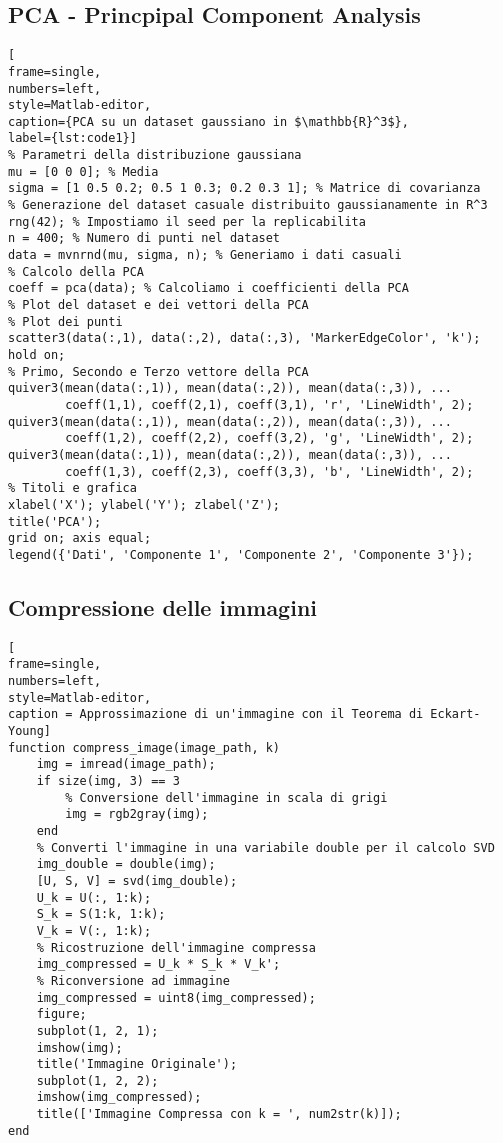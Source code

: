 \documentclass[11pt]{article}
\begin{document}
\subsection{PCA - Princpipal Component Analysis}\label{pca}
\begin{lstlisting}[
frame=single,
numbers=left,
style=Matlab-editor,
caption={PCA su un dataset gaussiano in $\mathbb{R}^3$},
label={lst:code1}]
% Parametri della distribuzione gaussiana
mu = [0 0 0]; % Media
sigma = [1 0.5 0.2; 0.5 1 0.3; 0.2 0.3 1]; % Matrice di covarianza
% Generazione del dataset casuale distribuito gaussianamente in R^3
rng(42); % Impostiamo il seed per la replicabilita
n = 400; % Numero di punti nel dataset
data = mvnrnd(mu, sigma, n); % Generiamo i dati casuali
% Calcolo della PCA
coeff = pca(data); % Calcoliamo i coefficienti della PCA
% Plot del dataset e dei vettori della PCA
% Plot dei punti
scatter3(data(:,1), data(:,2), data(:,3), 'MarkerEdgeColor', 'k'); 
hold on;
% Primo, Secondo e Terzo vettore della PCA
quiver3(mean(data(:,1)), mean(data(:,2)), mean(data(:,3)), ...
        coeff(1,1), coeff(2,1), coeff(3,1), 'r', 'LineWidth', 2); 
quiver3(mean(data(:,1)), mean(data(:,2)), mean(data(:,3)), ...
        coeff(1,2), coeff(2,2), coeff(3,2), 'g', 'LineWidth', 2);
quiver3(mean(data(:,1)), mean(data(:,2)), mean(data(:,3)), ...
        coeff(1,3), coeff(2,3), coeff(3,3), 'b', 'LineWidth', 2);
% Titoli e grafica 
xlabel('X'); ylabel('Y'); zlabel('Z');
title('PCA');
grid on; axis equal;
legend({'Dati', 'Componente 1', 'Componente 2', 'Componente 3'});
\end{lstlisting}
\newpage
\subsection{Compressione delle immagini}\label{img}
\begin{lstlisting}[
frame=single,
numbers=left,
style=Matlab-editor,
caption = Approssimazione di un'immagine con il Teorema di Eckart-Young]
function compress_image(image_path, k)
    img = imread(image_path);
    if size(img, 3) == 3
        % Conversione dell'immagine in scala di grigi
        img = rgb2gray(img);
    end    
    % Converti l'immagine in una variabile double per il calcolo SVD
    img_double = double(img);
    [U, S, V] = svd(img_double);
    U_k = U(:, 1:k);
    S_k = S(1:k, 1:k);
    V_k = V(:, 1:k);
    % Ricostruzione dell'immagine compressa
    img_compressed = U_k * S_k * V_k';
    % Riconversione ad immagine
    img_compressed = uint8(img_compressed);
    figure;
    subplot(1, 2, 1);
    imshow(img);
    title('Immagine Originale'); 
    subplot(1, 2, 2);
    imshow(img_compressed);
    title(['Immagine Compressa con k = ', num2str(k)]);
end
\end{lstlisting}
\newpage
\end{document}
